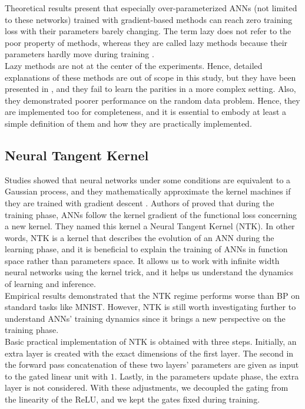 \documentclass[a4paper, nobind]{templates/ociamthesis}
\begin{document}
Theoretical results present that especially over-parameterized ANNs (not limited to these networks) trained with gradient-based methods can reach zero training loss with their parameters barely changing. The term lazy does not refer to the poor property of methods, whereas they are called lazy methods because their parameters hardly move during training \cite{chizat2020lazy}.\\
Lazy methods are not at the center of the experiments. Hence, detailed explanations of these methods are out of scope in this study, but they have been presented in \cite{DBLP:journals/corr/abs-2002-07400, chizat2020implicit}, and they fail to learn the parities in a more complex setting. Also, they demonstrated poorer performance on the random data problem. Hence, they are implemented too for completeness, and it is essential to embody at least a simple definition of them and how they are practically implemented.

\hypertarget{neural-tangent-kernel}{%
\subsection{Neural Tangent Kernel}\label{neural-tangent-kernel}}

Studies showed that neural networks under some conditions are equivalent to a Gaussian process, and they mathematically approximate the kernel machines if they are trained with gradient descent \cite{lee2018deep, domingos2020model}. Authors of \cite{DBLP:journals/corr/abs-1806-07572} proved that during the training phase, ANNs follow the kernel gradient of the functional loss concerning a new kernel. They named this kernel a Neural Tangent Kernel (NTK). In other words, NTK is a kernel that describes the evolution of an ANN during the learning phase, and it is beneficial to explain the training of ANNs in function space rather than parameters space. It allows us to work with infinite width neural networks using the kernel trick, and it helps us understand the dynamics of learning and inference.\\
Empirical results demonstrated that the NTK regime performs worse than BP on standard tasks like MNIST. However, NTK is still worth investigating further to understand ANNs' training dynamics since it brings a new perspective on the training phase.\\
Basic practical implementation of NTK is obtained with three steps. Initially, an extra layer is created with the exact dimensions of the first layer. The second in the forward pass concatenation of these two layers' parameters are given as input to the gated linear unit with \(1\). Lastly, in the parameters update phase, the extra layer is not considered. With these adjustments, we decoupled the gating from the linearity of the ReLU, and we kept the gates fixed during training.
\end{document}
